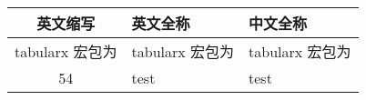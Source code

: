 \cleardoublepage
{}
\begin{table}[htbp]
    \centering
    \fontsize{10}{6}
    \begin{tabularx}{\linewidth}{cX<{\centering}X<{\centering}}
        \toprule \textbf{英文缩写}&\textbf{英文全称}&\textbf{中文全称}\\
        \midrule tabularx 宏包为&tabularx 宏包为&tabularx 宏包为\\
        {\color{red} 54}&test&test\\
        \bottomrule
    \end{tabularx}
\end{table}

